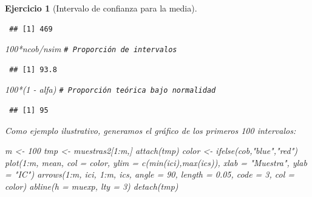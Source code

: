 \documentclass[
]{book}
\newenvironment{Shaded}{\begin{snugshade}}{\end{snugshade}}
\newcommand{\AttributeTok}[1]{\textcolor[rgb]{0.77,0.63,0.00}{#1}}
\newcommand{\CommentTok}[1]{\textcolor[rgb]{0.56,0.35,0.01}{\textit{#1}}}
\newcommand{\DecValTok}[1]{\textcolor[rgb]{0.00,0.00,0.81}{#1}}
\newcommand{\FloatTok}[1]{\textcolor[rgb]{0.00,0.00,0.81}{#1}}
\newcommand{\FunctionTok}[1]{\textcolor[rgb]{0.00,0.00,0.00}{#1}}
\newcommand{\NormalTok}[1]{#1}
\newcommand{\OtherTok}[1]{\textcolor[rgb]{0.56,0.35,0.01}{#1}}
\newcommand{\SpecialCharTok}[1]{\textcolor[rgb]{0.00,0.00,0.00}{#1}}
\newcommand{\StringTok}[1]{\textcolor[rgb]{0.31,0.60,0.02}{#1}}
\theoremstyle{break}
\newtheorem{exercise}{Ejercicio}[chapter]
\theoremstyle{nonumberplain}
\renewcommand{\CommentTok}[1]{\textcolor[rgb]{0.41,0.41,0.41}{\texttt{#1}}}
\begin{document}
\begin{exercise}[Intervalo de confianza para la media]
\begin{enumerate}
\begin{verbatim}
 ## [1] 469
\end{verbatim}

\begin{Shaded}
\begin{Highlighting}[]
\DecValTok{100}\SpecialCharTok{*}\NormalTok{ncob}\SpecialCharTok{/}\NormalTok{nsim     }\CommentTok{\# Proporción de intervalos}
\end{Highlighting}
\end{Shaded}

\begin{verbatim}
 ## [1] 93.8
\end{verbatim}

\begin{Shaded}
\begin{Highlighting}[]
\DecValTok{100}\SpecialCharTok{*}\NormalTok{(}\DecValTok{1} \SpecialCharTok{{-}}\NormalTok{ alfa)    }\CommentTok{\# Proporción teórica bajo normalidad}
\end{Highlighting}
\end{Shaded}

\begin{verbatim}
 ## [1] 95
\end{verbatim}

  Como ejemplo ilustrativo, generamos el gráfico de los primeros 100 intervalos:

\begin{Shaded}
\begin{Highlighting}[]
\NormalTok{m }\OtherTok{\textless{}{-}} \DecValTok{100}
\NormalTok{tmp }\OtherTok{\textless{}{-}}\NormalTok{ muestras2[}\DecValTok{1}\SpecialCharTok{:}\NormalTok{m,]}
\FunctionTok{attach}\NormalTok{(tmp)}
\NormalTok{color }\OtherTok{\textless{}{-}} \FunctionTok{ifelse}\NormalTok{(cob,}\StringTok{"blue"}\NormalTok{,}\StringTok{"red"}\NormalTok{)}
\FunctionTok{plot}\NormalTok{(}\DecValTok{1}\SpecialCharTok{:}\NormalTok{m, mean, }\AttributeTok{col =}\NormalTok{ color, }\AttributeTok{ylim =} \FunctionTok{c}\NormalTok{(}\FunctionTok{min}\NormalTok{(ici),}\FunctionTok{max}\NormalTok{(ics)), }
     \AttributeTok{xlab =} \StringTok{"Muestra"}\NormalTok{, }\AttributeTok{ylab =} \StringTok{"IC"}\NormalTok{)}
\FunctionTok{arrows}\NormalTok{(}\DecValTok{1}\SpecialCharTok{:}\NormalTok{m, ici, }\DecValTok{1}\SpecialCharTok{:}\NormalTok{m, ics, }\AttributeTok{angle =} \DecValTok{90}\NormalTok{, }\AttributeTok{length =} \FloatTok{0.05}\NormalTok{, }\AttributeTok{code =} \DecValTok{3}\NormalTok{, }\AttributeTok{col =}\NormalTok{ color)}
\FunctionTok{abline}\NormalTok{(}\AttributeTok{h =}\NormalTok{ muexp, }\AttributeTok{lty =} \DecValTok{3}\NormalTok{)}
\FunctionTok{detach}\NormalTok{(tmp)}
\end{Highlighting}
\end{Shaded}


\end{enumerate}
\end{exercise}
\end{document}
